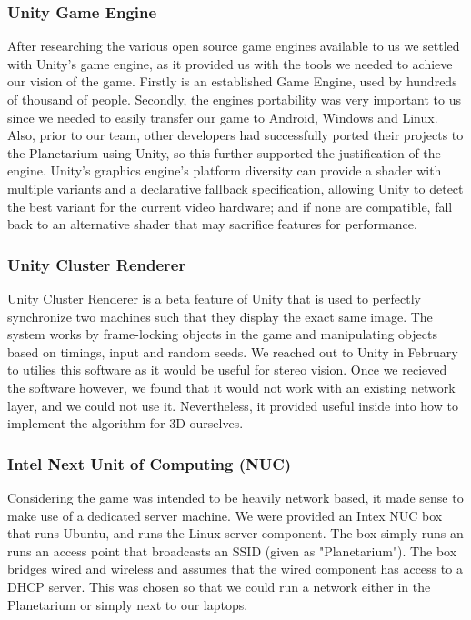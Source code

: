 \documentclass[11pt,a4paper]{article}
\begin{document}
 \subsubsection{  Unity Game Engine}

 After researching the various open source game engines available to us we settled with Unity’s game engine, as it provided us with the tools we needed to achieve our vision of the game. Firstly is an established Game Engine, used by hundreds of thousand of people. Secondly, the engines portability was very important to us since we needed to easily transfer our game to Android, Windows and Linux. Also, prior to our team, other developers had successfully ported their projects to the Planetarium using Unity, so this further supported the justification of the engine. Unity's graphics engine's platform diversity can provide a shader with multiple variants and a declarative fallback specification, allowing Unity to detect the best variant for the current video hardware; and if none are compatible, fall back to an alternative shader that may sacrifice features for performance.

 \subsubsection{ Unity Cluster Renderer}
Unity Cluster Renderer is a beta feature of Unity that is used to perfectly synchronize two machines such that they display the exact same image. The system works by frame-locking objects in the game and manipulating objects based on timings, input and random seeds. We reached out to Unity in February to utilies this software as it would be useful for stereo vision. Once we recieved the software however, we found that it would not work with an existing network layer, and we could not use it. Nevertheless, it provided useful inside into how to implement the algorithm for 3D ourselves.

 \subsubsection{ Intel Next Unit of Computing (NUC)}
Considering the game was intended to be heavily network based, it made sense to make use of a dedicated server machine. We were provided an Intex NUC box that runs Ubuntu, and runs the Linux server component. The box simply runs an runs an access point that broadcasts an SSID (given as "Planetarium"). The box bridges wired and wireless and assumes that the wired component has access to a DHCP server. This was chosen so that we could run a network either in the Planetarium or simply next to our laptops.
\end{document}
